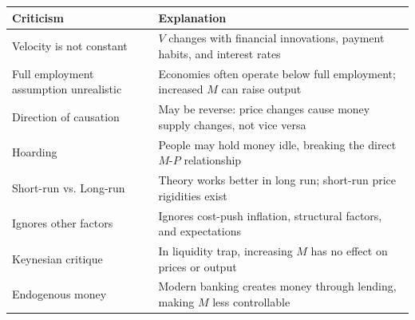 \documentclass[12pt,a4paper]{article}
\begin{document}
\begin{center}
\begin{tabular}{@{}p{4cm}p{10cm}@{}}
\toprule
\textbf{Criticism} & \textbf{Explanation} \\
\midrule
Velocity is not constant & $V$ changes with financial innovations, payment habits, and interest rates \\
\addlinespace
Full employment assumption unrealistic & Economies often operate below full employment; increased $M$ can raise output \\
\addlinespace
Direction of causation & May be reverse: price changes cause money supply changes, not vice versa \\
\addlinespace
Hoarding & People may hold money idle, breaking the direct $M$-$P$ relationship \\
\addlinespace
Short-run vs. Long-run & Theory works better in long run; short-run price rigidities exist \\
\addlinespace
Ignores other factors & Ignores cost-push inflation, structural factors, and expectations \\
\addlinespace
Keynesian critique & In liquidity trap, increasing $M$ has no effect on prices or output \\
\addlinespace
Endogenous money & Modern banking creates money through lending, making $M$ less controllable \\
\bottomrule
\end{tabular}
\end{center}
\end{document}
